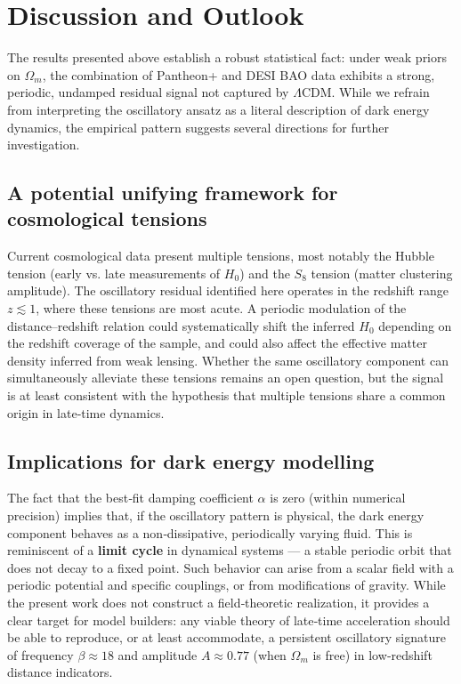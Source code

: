 \documentclass[10pt,a4paper,twocolumn]{article}
\begin{document}
\section{Discussion and Outlook}
The results presented above establish a robust statistical fact: under weak priors on $\Omega_m$, the combination of Pantheon+ and DESI BAO data exhibits a strong, periodic, undamped residual signal not captured by $\Lambda$CDM. While we refrain from interpreting the oscillatory ansatz as a literal description of dark energy dynamics, the empirical pattern suggests several directions for further investigation.

\subsection{A potential unifying framework for cosmological tensions}
Current cosmological data present multiple tensions, most notably the Hubble tension (early vs. late measurements of $H_0$) and the $S_8$ tension (matter clustering amplitude). The oscillatory residual identified here operates in the redshift range $z\lesssim1$, where these tensions are most acute. A periodic modulation of the distance–redshift relation could systematically shift the inferred $H_0$ depending on the redshift coverage of the sample, and could also affect the effective matter density inferred from weak lensing. Whether the same oscillatory component can simultaneously alleviate these tensions remains an open question, but the signal is at least consistent with the hypothesis that multiple tensions share a common origin in late‑time dynamics.

\subsection{Implications for dark energy modelling}
The fact that the best‑fit damping coefficient $\alpha$ is zero (within numerical precision) implies that, if the oscillatory pattern is physical, the dark energy component behaves as a non‑dissipative, periodically varying fluid. This is reminiscent of a \textbf{limit cycle} in dynamical systems — a stable periodic orbit that does not decay to a fixed point. Such behavior can arise from a scalar field with a periodic potential and specific couplings, or from modifications of gravity. While the present work does not construct a field‑theoretic realization, it provides a clear target for model builders: any viable theory of late‑time acceleration should be able to reproduce, or at least accommodate, a persistent oscillatory signature of frequency $\beta\approx18$ and amplitude $A\approx0.77$ (when $\Omega_m$ is free) in low‑redshift distance indicators.
\end{document}
